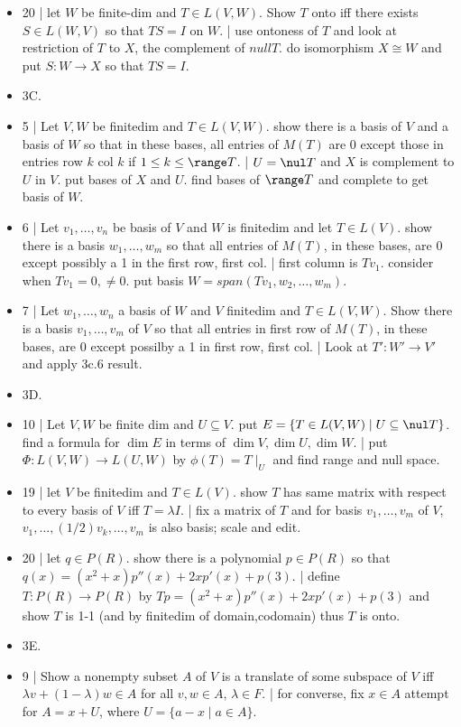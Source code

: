 \begin{itemize}
	\item 20 | let $W$ be finite-dim and $T \in L(V,W)$. Show $T$ onto iff there exists $S \in L(W,V)$ so that $TS=I$ on $W$. | use ontoness of $T$ and look at restriction of $T$ to $X$, the complement of $null T$. do isomorphism $X \cong W$ and put $S: W \to X$ so that $TS=I$. 
	\item 3C. 
	\item 5 | Let $V,W$ be finitedim and $T \in L(V,W)$. show there is a basis of $V$ and a basis of $W$ so that in these bases, all entries of $M(T)$ are 0 except those in entries row $k$ col $k$ if $1 \leq k \leq \range T$. | $U=\nul T$ and $X$ is complement to $U$ in $V$. put bases of $X$ and $U$. find bases of $\range T$ and complete to get basis of $W$. 
	\item 6 | Let $v_1,\dots,v_n$ be basis of $V$ and $W$ is finitedim and let $T \in L(V)$. show there is a basis $w_1,\dots,w_m$ so that all entries of $M(T)$, in these bases, are 0 except possibly a 1 in the first row, first col. | first column is $Tv_1$. consider when $Tv_1 = 0, \neq 0$. put basis $W = span(Tv_1,w_2,\dots,w_m)$. 
	\item 7 | Let $w_1,\dots,w_n$ a basis of $W$ and $V$ finitedim and $T \in L(V,W)$. Show there is a basis $v_1,\dots,v_m$ of $V$ so that all entries in first row of $M(T)$, in these bases, are 0 except possilby a 1 in first row, first col. | Look at $T': W' \to V'$ and apply 3c.6 result. 
	\item 3D. 
	\item 10 | Let $V,W$ be finite dim and $U \subseteq V$. put $E = \{T \in L(V,W) \mid U \subseteq \nul T\}$. find a formula for $\dim E$ in terms of $\dim V, \dim U, \dim W$. | put $\Phi: L(V,W) \to L(U,W)$ by $\phi(T) = T \mid_U$ and find range and null space. 
	\item 19 | let $V$ be finitedim and $T \in L(V)$. show $T$ has same matrix with respect to every basis of $V$ iff $T = \lambda I$. | fix a matrix of $T$ and for basis $v_1,\dots,v_m$ of $V$, $v_1,\dots,(1/2)v_k,\dots,v_m$ is also basis; scale and edit. 
	\item 20 | let $q \in P(R)$. show there is a polynomial $p \in P(R)$ so that $q(x) = (x^2 + x)p''(x) + 2xp'(x) + p(3)$. | define $T: P(R) \to P(R)$ by $Tp = (x^2 + x)p''(x) + 2xp'(x) + p(3)$ and show $T$ is 1-1 (and by finitedim of domain,codomain) thus $T$ is onto. 
	\item 3E. 
	\item 9 | Show a nonempty subset $A$ of $V$ is a translate of some subspace of $V$ iff $\lambda v + (1-\lambda)w \in A$ for all $v,w \in A$, $\lambda \in F$. | for converse, fix $x \in A$ attempt for $A = x + U$, where $U = \{a-x \mid a \in A\}$. 

\end{itemize}
